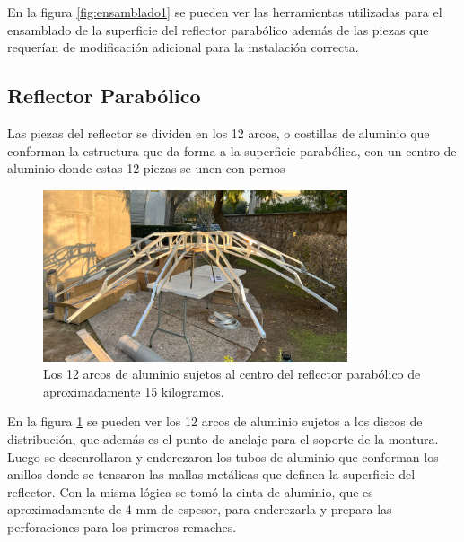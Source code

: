 En la figura \ref{fig:ensamblado1} se pueden ver las herramientas utilizadas para el ensamblado de la superficie del reflector parabólico además de las piezas que requerían de modificación adicional para la instalación correcta.\\

\subsection{Reflector Parabólico}

Las piezas del reflector se dividen en los 12 arcos, o costillas de aluminio que conforman la estructura que da forma a la superficie parabólica, con un centro de aluminio donde estas 12 piezas se unen con pernos\\

\begin{figure}
    \centering
    \includegraphics[width=0.8\textwidth]{img/estructura1}
    \caption{Los 12 arcos de aluminio sujetos al centro del reflector parabólico de aproximadamente 15 kilogramos.}
    \label{fig:ensamble2}
\end{figure}

En la figura \ref{fig:ensamble2} se pueden ver los 12 arcos de aluminio sujetos a los discos de distribución, que además es el punto de anclaje para el soporte de la montura.\\

Luego se desenrollaron y enderezaron los tubos de aluminio que conforman los anillos donde se tensaron las mallas metálicas que definen la superficie del reflector. Con la misma lógica se tomó la cinta de aluminio, que es aproximadamente de 4 mm de espesor, para enderezarla y prepara las perforaciones para los primeros remaches.\\

